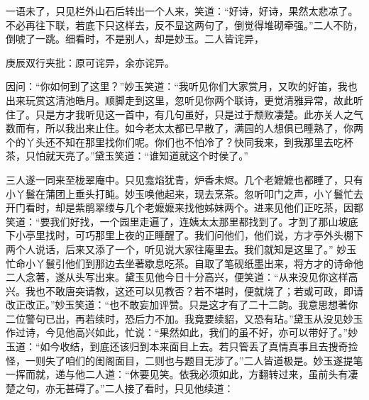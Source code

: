 \begin{parag}


    一语未了，只见栏外山石后转出一个人来，笑道：“好诗，好诗，果然太悲凉了。不必再往下联，若底下只这样去，反不显这两句了，倒觉得堆砌牵强。”二人不防，倒唬了一跳。细看时，不是别人，却是妙玉。二人皆诧异，\begin{note}庚辰双行夹批：原可诧异，余亦诧异。\end{note}因问：“你如何到了这里？”妙玉笑道：“我听见你们大家赏月，又吹的好笛，我也出来玩赏这清池皓月。顺脚走到这里，忽听见你两个联诗，更觉清雅异常，故此听住了。只是方才我听见这一首中，有几句虽好，只是过于颓败凄楚。此亦关人之气数而有，所以我出来止住。如今老太太都已早散了，满园的人想俱已睡熟了，你两个的丫头还不知在那里找你们呢。你们也不怕冷了？快同我来，到我那里去吃杯茶，只怕就天亮了。”黛玉笑道：“谁知道就这个时侯了。”
\end{parag}


\begin{parag}


    三人遂一同来至栊翠庵中。只见龛焰犹青，炉香未烬。几个老嬷嬷也都睡了，只有小丫鬟在蒲团上垂头打盹。妙玉唤他起来，现去烹茶。忽听叩门之声，小丫鬟忙去开门看时，却是紫鹃翠缕与几个老嬷嬷来找他姊妹两个。进来见他们正吃茶，因都笑道：“要我们好找，一个园里走遍了，连姨太太那里都找到了。才到了那山坡底下小亭里找时，可巧那里上夜的正睡醒了。我们问他们，他们说，方才亭外头棚下两个人说话，后来又添了一个，听见说大家往庵里去。我们就知是这里了。” 妙玉忙命小丫鬟引他们到那边去坐著歇息吃茶。自取了笔砚纸墨出来，将方才的诗命他二人念著，遂从头写出来。黛玉见他今日十分高兴，便笑道：“从来没见你这样高兴。我也不敢唐突请教，这还可以见教否？若不堪时，便就烧了；若或可政，即请改正改正。”妙玉笑道：“也不敢妄加评赞。只是这才有了二十二韵。我意思想著你二位警句已出，再若续时，恐后力不加。我竟要续貂，又恐有玷。”黛玉从没见妙玉作过诗，今见他高兴如此，忙说：“果然如此，我们的虽不好，亦可以带好了。”妙玉道：“如今收结，到底还该归到本来面目上去。若只管丢了真情真事且去搜奇捡怪，一则失了咱们的闺阁面目，二则也与题目无涉了。”二人皆道极是。妙玉遂提笔一挥而就，递与他二人道：“休要见笑。依我必须如此，方翻转过来，虽前头有凄楚之句，亦无甚碍了。”二人接了看时，只见他续道：
\end{parag}

